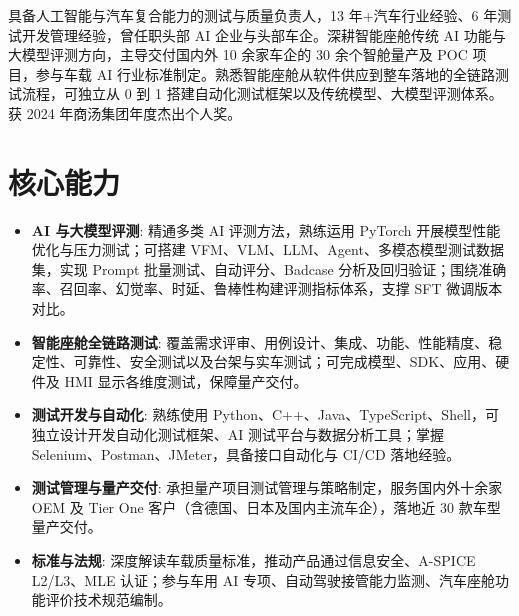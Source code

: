 \documentclass[11pt,a4paper,sans]{moderncv}
\begin{document}
\makecvtitle


\vspace{6pt}
\small{具备人工智能与汽车复合能力的测试与质量负责人，13 年+汽车行业经验、6 年测试开发管理经验，曾任职头部 AI 企业与头部车企。深耕智能座舱传统 AI 功能与大模型评测方向，主导交付国内外 10 余家车企的 30 余个智舱量产及 POC 项目，参与车载 AI 行业标准制定。熟悉智能座舱从软件供应到整车落地的全链路测试流程，可独立从 0 到 1 搭建自动化测试框架以及传统模型、大模型评测体系。获 2024 年商汤集团年度杰出个人奖。}


\section{核心能力}
\vspace{1pt}
\begin{itemize}

\item \textbf{AI 与大模型评测}: 精通多类 AI 评测方法，熟练运用 PyTorch 开展模型性能优化与压力测试；可搭建 VFM、VLM、LLM、Agent、多模态模型测试数据集，实现 Prompt 批量测试、自动评分、Badcase 分析及回归验证；围绕准确率、召回率、幻觉率、时延、鲁棒性构建评测指标体系，支撑 SFT 微调版本对比。

\item \textbf{智能座舱全链路测试}: 覆盖需求评审、用例设计、集成、功能、性能精度、稳定性、可靠性、安全测试以及台架与实车测试；可完成模型、SDK、应用、硬件及 HMI 显示各维度测试，保障量产交付。

\item \textbf{测试开发与自动化}: 熟练使用 Python、C++、Java、TypeScript、Shell，可独立设计开发自动化测试框架、AI 测试平台与数据分析工具；掌握 Selenium、Postman、JMeter，具备接口自动化与 CI/CD 落地经验。

\item \textbf{测试管理与量产交付}: 承担量产项目测试管理与策略制定，服务国内外十余家 OEM 及 Tier One 客户（含德国、日本及国内主流车企），落地近 30 款车型量产交付。

\item \textbf{标准与法规}: 深度解读车载质量标准，推动产品通过信息安全、A-SPICE L2/L3、MLE 认证；参与车用 AI 专项、自动驾驶接管能力监测、汽车座舱功能评价技术规范编制。

\end{itemize}
\end{document}

